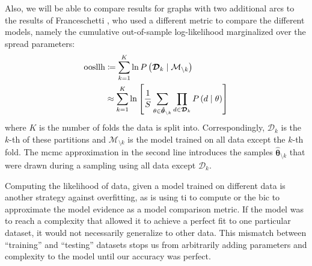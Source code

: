 \documentclass[\relativeRoot/main.tex]{subfiles}
\begin{document}
Also, we will be able to compare results for graphs with two additional arcs to the results of Franceschetti \cite{franceschetti_comparison_2022}, who used a different metric to compare the different models, namely the cumulative out-of-sample log-likelihood marginalized over the spread parameters:
%
\begin{equation}
    \begin{aligned}
        \text{oosllh} &\coloneqq \sum_{k=1}^K{\ln{ P \left( \boldsymbol{\mathcal{D}}_k \mid \mathcal{M}_{\setminus k} \right) }} \\
        &\approx \sum_{k=1}^K{\ln{ \left[ \frac{1}{S} \sum_{\theta \in \boldsymbol{\hat{\theta}}_{\setminus k}}{ \prod_{d \in \boldsymbol{\mathcal{D}}_k}{ P \left( d \mid \theta \right) } } \right] }}
    \end{aligned}
\end{equation}
%
where $K$ is the number of folds the data is split into. Correspondingly, $\boldsymbol{\mathcal{D}}_k$ is the $k$-th of these partitions and $\mathcal{M}_{\setminus k}$ is the model trained on all data except the $k$-th fold. The \gls{mcmc} approximation in the second line introduces the samples $\boldsymbol{\hat{\theta}}_{\setminus k}$ that were drawn during a sampling using all data except $\boldsymbol{\mathcal{D}}_k$.

Computing the likelihood of data, given a model trained on different data is another strategy against overfitting, as is using \acrlong{ti} to compute or the \acrlong{bic} to approximate the model evidence as a model comparison metric. If the model was to reach a complexity that allowed it to achieve a perfect fit to one particular dataset, it would not necessarily generalize to other data. This mismatch between ``training'' and ``testing'' datasets stops us from arbitrarily adding parameters and complexity to the model until our accuracy was perfect.
\end{document}
